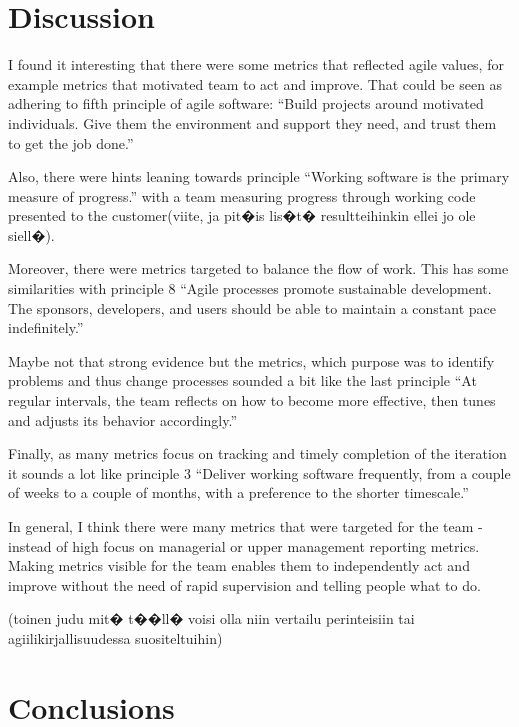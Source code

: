 \documentclass{sig-alternate}
\begin{document}
\section{Discussion}

I found it interesting that there were some metrics that reflected agile
values, for example metrics that motivated team to act and improve. That could
be seen as adhering to fifth principle of agile software: ``Build projects
around motivated individuals. Give them the environment and support they need,
and trust them to get the job done.''

Also, there were hints leaning towards principle ``Working software is the
primary measure of progress.'' with a team measuring progress through working
code presented to the customer(viite, ja pit�is lis�t� resultteihinkin ellei
jo ole siell�).

Moreover, there were metrics targeted to balance the flow of work. This has
some similarities with principle 8 ``Agile processes promote sustainable
development. The sponsors, developers, and users should be able to maintain a
constant pace indefinitely.''

Maybe not that strong evidence but the metrics, which purpose was to identify
problems and thus change processes sounded a bit like the last principle ``At
regular intervals, the team reflects on how to become more effective, then
tunes and adjusts its behavior accordingly.''

Finally, as many metrics focus on tracking and timely completion of the
iteration it sounds a lot like principle 3 ``Deliver working software
frequently, from a couple of weeks to a couple of months, with a preference to
the shorter timescale.''

In general, I think there were many metrics that were targeted for the team -
instead of high focus on managerial or upper management reporting metrics.
Making metrics visible for the team enables them to independently act and
improve without the need of rapid supervision and telling people what to do.


(toinen judu mit� t��ll� voisi olla niin vertailu perinteisiin tai
agiilikirjallisuudessa suositeltuihin)


\section{Conclusions}

\end{document}
